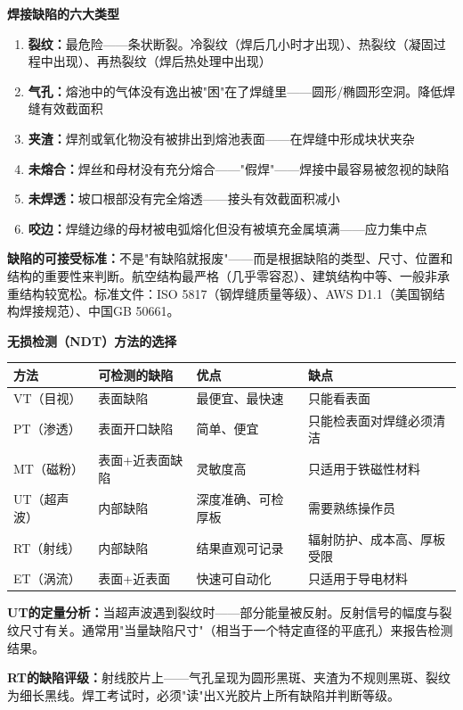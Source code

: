 \documentclass[a4paper,11pt]{ctexbook}
\newenvironment{qualitative}{\vspace{0.3cm}\noindent\begin{tcolorbox}[colback=themeblue!5!white,colframe=themeblue!60!black,title=\textcolor{themeblue}{\textbf{定性分析}}]\vspace{0.1cm}}{\end{tcolorbox}\vspace{0.3cm}}
\newenvironment{quantitative}{\vspace{0.3cm}\noindent\begin{tcolorbox}[colback=quant!5!white,colframe=quant!60!black,title=\textcolor{quant}{\textbf{定量分析}}]\vspace{0.1cm}}{\end{tcolorbox}\vspace{0.3cm}}
\begin{document}
\begin{qualitative}
\textbf{焊接缺陷的六大类型}

\begin{enumerate}
  \item \textbf{裂纹：}最危险——条状断裂。冷裂纹（焊后几小时才出现）、热裂纹（凝固过程中出现）、再热裂纹（焊后热处理中出现）
  \item \textbf{气孔：}熔池中的气体没有逸出被"困"在了焊缝里——圆形/椭圆形空洞。降低焊缝有效截面积
  \item \textbf{夹渣：}焊剂或氧化物没有被排出到熔池表面——在焊缝中形成块状夹杂
  \item \textbf{未熔合：}焊丝和母材没有充分熔合——"假焊"——焊接中最容易被忽视的缺陷
  \item \textbf{未焊透：}坡口根部没有完全熔透——接头有效截面积减小
  \item \textbf{咬边：}焊缝边缘的母材被电弧熔化但没有被填充金属填满——应力集中点
\end{enumerate}

\textbf{缺陷的可接受标准：}不是"有缺陷就报废"——而是根据缺陷的类型、尺寸、位置和结构的重要性来判断。航空结构最严格（几乎零容忍）、建筑结构中等、一般非承重结构较宽松。标准文件：ISO 5817（钢焊缝质量等级）、AWS D1.1（美国钢结构焊接规范）、中国GB 50661。
\end{qualitative}

\begin{quantitative}
\textbf{无损检测（NDT）方法的选择}

\begin{center}
\begin{tabular}{llll}
\toprule
\textbf{方法} & \textbf{可检测的缺陷} & \textbf{优点} & \textbf{缺点} \\
\midrule
VT（目视） & 表面缺陷 & 最便宜、最快速 & 只能看表面 \\
PT（渗透） & 表面开口缺陷 & 简单、便宜 & 只能检表面对焊缝必须清洁 \\
MT（磁粉） & 表面+近表面缺陷 & 灵敏度高 & 只适用于铁磁性材料 \\
UT（超声波） & 内部缺陷 & 深度准确、可检厚板 & 需要熟练操作员 \\
RT（射线） & 内部缺陷 & 结果直观可记录 & 辐射防护、成本高、厚板受限 \\
ET（涡流） & 表面+近表面 & 快速可自动化 & 只适用于导电材料 \\
\bottomrule
\end{tabular}
\end{center}

\textbf{UT的定量分析：}当超声波遇到裂纹时——部分能量被反射。反射信号的幅度与裂纹尺寸有关。通常用"当量缺陷尺寸"（相当于一个特定直径的平底孔）来报告检测结果。

\textbf{RT的缺陷评级：}射线胶片上——气孔呈现为圆形黑斑、夹渣为不规则黑斑、裂纹为细长黑线。焊工考试时，必须"读"出X光胶片上所有缺陷并判断等级。
\end{quantitative}
\end{document}
